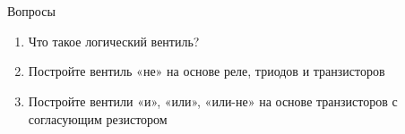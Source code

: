 \documentclass[xetex,aspectratio=43]{beamer}
\begin{document}
\section*{}

\begin{frame}{Вопросы}
\begin{enumerate}
\tightlist
\item
  Что такое логический вентиль?
\item
  Постройте вентиль «не» на основе реле, триодов и транзисторов
\item
  Постройте вентили «и», «или», «или-не» на основе транзисторов с
  согласующим резистором
\end{enumerate}
\end{frame}

\postamble
\end{document}
